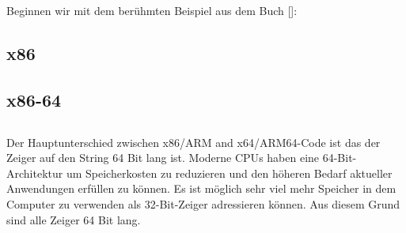 \mysection{\HelloWorldSectionName}
\label{sec:helloworld}

Beginnen wir mit dem berühmten Beispiel aus dem Buch [\KRBook]:



\subsection{x86}





\subsection{x86-64}







\subsection{\Conclusion{}}

Der Hauptunterschied zwischen x86/ARM and x64/ARM64-Code ist das der Zeiger auf den String 64 Bit lang ist.
Moderne \ac{CPU}s haben eine 64-Bit-Architektur um Speicherkosten zu reduzieren und den höheren Bedarf
aktueller Anwendungen erfüllen zu können.
Es ist möglich sehr viel mehr Speicher in dem Computer zu verwenden als 32-Bit-Zeiger adressieren können.
Aus diesem Grund sind alle Zeiger 64 Bit lang.



